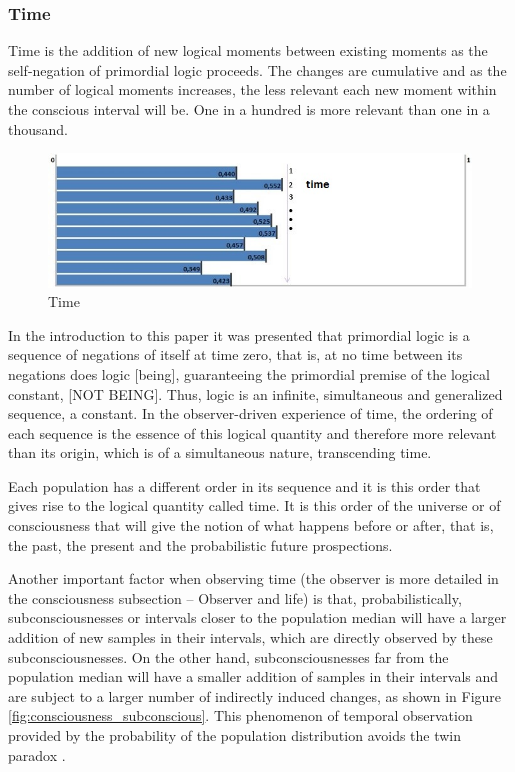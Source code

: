\subsubsection{Time}
Time is the addition of new logical moments between existing moments as the self-negation of primordial logic proceeds. The changes are cumulative and as the number of logical moments increases, the less relevant each new moment within the conscious interval will be. One in a hundred is more relevant than one in a thousand. 
	\begin{figure}[H]
	\caption{Time}
	\label{fig:consciousness_time}
	\centering
	\includegraphics[scale=.8]{sections/images/consciousness_time.jpg}
	\end{figure}

In the introduction to this paper it was presented that primordial logic is a sequence of negations of itself at time zero, that is, at no time between its negations does logic [being], guaranteeing the primordial premise of the logical constant, [NOT BEING]. Thus, logic is an infinite, simultaneous and generalized sequence, a constant. In the observer-driven experience of time, the ordering of each sequence is the essence of this logical quantity and therefore more relevant than its origin, which is of a simultaneous nature, transcending time.

Each population has a different order in its sequence and it is this order that gives rise to the logical quantity called time. It is this order of the universe or of consciousness that will give the notion of what happens before or after, that is, the past, the present and the probabilistic future prospections.

Another important factor when observing time (the observer is more detailed in the consciousness subsection – Observer and life) is that, probabilistically, subconsciousnesses or intervals closer to the population median will have a larger addition of new samples in their intervals, which are directly observed by these subconsciousnesses. On the other hand, subconsciousnesses far from the population median will have a smaller addition of samples in their intervals and are subject to a larger number of indirectly induced changes, as shown in Figure \ref{fig:consciousness_subconscious}.  This phenomenon of temporal observation provided by the probability of the population distribution avoids the twin paradox \cite{twin_paradox}.

